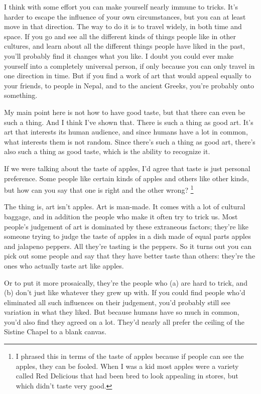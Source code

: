 \documentclass[12pt]{book}
\begin{document}
I think with some effort you can make yourself nearly immune to tricks.
It's harder to escape the influence of your own circumstances, but you
can at least move in that direction. The way to do it is to travel
widely, in both time and space. If you go and see all the different
kinds of things people like in other cultures, and learn about all the
different things people have liked in the past, you'll probably find it
changes what you like. I doubt you could ever make yourself into a
completely universal person, if only because you can only travel in one
direction in time. But if you find a work of art that would appeal
equally to your friends, to people in Nepal, and to the ancient Greeks,
you're probably onto something.

My main point here is not how to have good taste, but that there can
even be such a thing. And I think I've shown that. There is such a thing
as good art. It's art that interests its human audience, and since
humans have a lot in common, what interests them is not random. Since
there's such a thing as good art, there's also such a thing as good
taste, which is the ability to recognize it.

If we were talking about the taste of apples, I'd agree that taste is
just personal preference. Some people like certain kinds of apples and
others like other kinds, but how can you say that one is right and the
other wrong? \footnote{I phrased this in terms of the taste of apples because if people
can see the apples, they can be fooled. When I was a kid most apples
were a variety called Red Delicious that had been bred to look appealing
in stores, but which didn't taste very good.}

The thing is, art isn't apples. Art is man-made. It comes with a lot of
cultural baggage, and in addition the people who make it often try to
trick us. Most people's judgement of art is dominated by these
extraneous factors; they're like someone trying to judge the taste of
apples in a dish made of equal parts apples and jalapeno peppers. All
they're tasting is the peppers. So it turns out you can pick out some
people and say that they have better taste than others: they're the ones
who actually taste art like apples.

Or to put it more prosaically, they're the people who (a) are hard to
trick, and (b) don't just like whatever they grew up with. If you could
find people who'd eliminated all such influences on their judgement,
you'd probably still see variation in what they liked. But because
humans have so much in common, you'd also find they agreed on a lot.
They'd nearly all prefer the ceiling of the Sistine Chapel to a blank
canvas.
\end{document}
